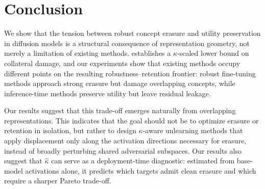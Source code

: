 \section{Conclusion}
\label{sec:conclusion}
We show that the tension between robust concept erasure and utility preservation in diffusion models is a structural consequence of representation geometry, not merely a limitation of existing methods.
 establishes a $\kappa$-scaled lower bound on collateral damage, and our experiments show that existing methods occupy different points on the resulting robustness--retention frontier: robust fine-tuning methods approach strong erasure but damage overlapping concepts, while inference-time methods preserve utility but leave residual leakage.

Our results suggest that this trade-off emerges naturally from overlapping representations. This indicates that the goal should not be to optimize erasure or retention in isolation, but rather to design $\kappa$-aware unlearning methods that apply displacement only along the activation directions necessary for erasure, instead of broadly perturbing shared adversarial subspaces. Our results also suggest that $\hat\kappa$ can serve as a deployment-time diagnostic: estimated from base-model activations alone, it predicts which targets admit clean erasure and which require a sharper Pareto trade-off.



